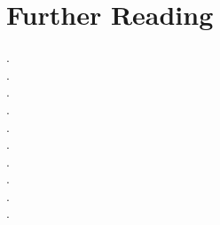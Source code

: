 \documentclass[notoc, symmetric, nobib, nols]{towcenter-guideto-book}
\newcommand{\blankpage}{\newpage\hbox{}\thispagestyle{empty}\newpage}
\begin{document}
\chapter{Further Reading}
\blankpage
\hspace{2ex}\small\cite{BBCNewsChatApps}.\\
\vspace{10pt}
\small\cite{BenEvansChatApps}.\\
\vspace{10pt}
\small\cite{MashableChatApps}.\\
\vspace{10pt}
\small\cite{MediumKik}.\\
\vspace{10pt}
\small\cite{TechCrunchBots}.\\
\vspace{10pt}
\small\cite{NYTbots}.\\
\vspace{10pt}
\small\cite{FCInsideSnapchat}.\\
\vspace{10pt}
\small\cite{BILINE}.\\
\vspace{10pt}
\small\cite{EngadgetFacebook}.\\
\vspace{10pt}
\small\cite{BBCYikYak}.\\






\end{document}
